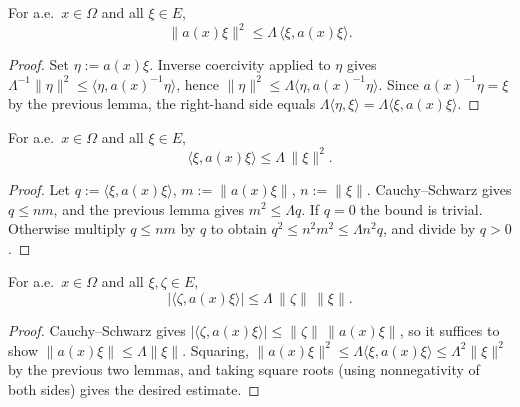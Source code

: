 \begin{lemma}
\label{lem:EllipticCoeff_mulVec_sq_le}
\leanok
For a.e.\ $x \in \Omega$ and all $\xi \in E$,
\begin{equation*}
  \|a(x)\xi\|^{2} \leq \Lambda \,\langle \xi, a(x)\xi\rangle.
\end{equation*}
\end{lemma}

\begin{proof}
\leanok
{}

Set $\eta := a(x)\xi$. Inverse coercivity applied to $\eta$ gives $\Lambda^{-1}\|\eta\|^{2} \leq \langle \eta, a(x)^{-1}\eta\rangle$, hence $\|\eta\|^{2} \leq \Lambda \langle \eta, a(x)^{-1}\eta\rangle$. Since $a(x)^{-1}\eta = \xi$ by the previous lemma, the right-hand side equals $\Lambda\langle \eta, \xi\rangle = \Lambda\langle \xi, a(x)\xi\rangle$.
\end{proof}

\begin{lemma}
\label{lem:EllipticCoeff_quadratic_upper}
\leanok
For a.e.\ $x \in \Omega$ and all $\xi \in E$,
\begin{equation*}
  \langle \xi, a(x)\xi\rangle \leq \Lambda\,\|\xi\|^{2}.
\end{equation*}
\end{lemma}

\begin{proof}
\leanok
{}

Let $q := \langle \xi, a(x)\xi\rangle$, $m := \|a(x)\xi\|$, $n := \|\xi\|$. Cauchy--Schwarz gives $q \leq n m$, and the previous lemma gives $m^{2} \leq \Lambda q$. If $q = 0$ the bound is trivial. Otherwise multiply $q \leq nm$ by $q$ to obtain $q^{2} \leq n^{2} m^{2} \leq \Lambda n^{2} q$, and divide by $q > 0$.
\end{proof}

\begin{lemma}
\label{lem:EllipticCoeff_mixed_bound}
\leanok
For a.e.\ $x \in \Omega$ and all $\xi, \zeta \in E$,
\begin{equation*}
  |\langle \zeta, a(x)\xi\rangle| \leq \Lambda\,\|\zeta\|\,\|\xi\|.
\end{equation*}
\end{lemma}

\begin{proof}
\leanok
{}

Cauchy--Schwarz gives $|\langle \zeta, a(x)\xi\rangle| \leq \|\zeta\|\,\|a(x)\xi\|$, so it suffices to show $\|a(x)\xi\| \leq \Lambda\|\xi\|$. Squaring, $\|a(x)\xi\|^{2} \leq \Lambda \langle \xi, a(x)\xi\rangle \leq \Lambda^{2}\|\xi\|^{2}$ by the previous two lemmas, and taking square roots (using nonnegativity of both sides) gives the desired estimate.
\end{proof}

